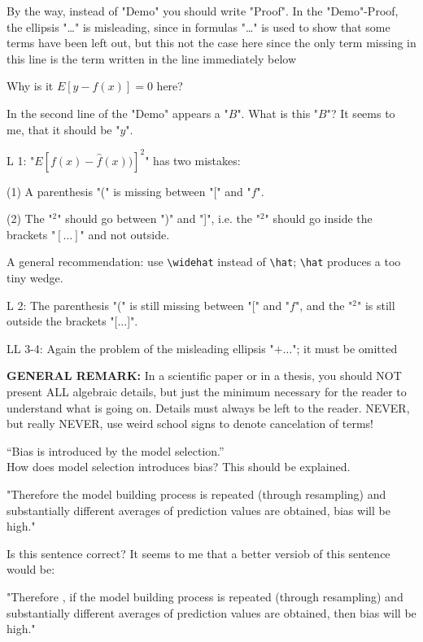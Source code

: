 \documentclass[12pt,reqno]{amsart}
\def\blue#1{{\color{blue} #1}}
\def\red#1{{\color{red} #1}}
\begin{document}
\begin{description}[style=unboxed,leftmargin=0cm,itemsep=3ex]
By the way, instead of "Demo" you should write "Proof".
In the "Demo"-Proof, the ellipsis "\dots" is misleading, since in formulas
"\dots" is used to show that some terms have been left out, but this not
the case here \red{since the only term missing in this line is the term
written in the line immediately below}

\red{Why is it $E[y-f(x)]=0$ here?}

\red{In the second line of the "Demo" appears a "$B$". What is this "$B$"?
It seems to me, that it should be "$y$".}



\blue{L 1:}\quad
"$E[f(x)-\widehat{f}(x))]^2$" has two mistakes:

(1) A parenthesis "(" is missing between "[" and "$f$".

(2) The "${}^2$" should go between ")" and "]", i.e. the "${}^2$" should
go inside the brackets "$[\dots]$" and not outside.

A general recommendation: use \verb!\widehat! instead of \verb!\hat!;
\verb!\hat! produces a too tiny wedge.

\blue{L 2:}\quad
The parenthesis "(" is still missing between "[" and "$f$", and the
"${}^2$" is still outside the brackets "[...]".

\blue{LL 3-4:}
Again the problem of the misleading ellipsis "$+\dots$";
it must be omitted

\red{{\bf GENERAL REMARK:}\quad
In a scientific paper or in a thesis, you should NOT present ALL
algebraic details, but just the minimum necessary for the reader
to understand what is going on.
Details must always be left to the reader.
NEVER, but really NEVER, use weird school signs to denote cancelation
of terms!}


``Bias is introduced by the model selection.'' \\
How does model selection introduces bias?
This should be explained.


"Therefore the model building process is repeated (through resampling)
and substantially different averages of prediction values are obtained,
bias will be high." 

Is this sentence correct?
It seems to me that a better versiob of this sentence would be:

"Therefore\red{, if} the model building process is repeated (through
resampling) and substantially different averages of prediction values
are obtained, \red{then} bias will be high."


\end{description}
\end{document}

